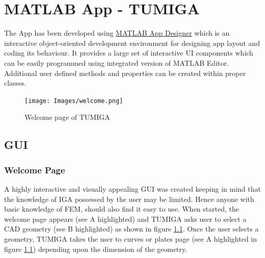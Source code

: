 \documentclass[12pt, a4paper]{report}
\begin{document}
 

\chapter{MATLAB App - TUMIGA}\label{chap: App}


The App has been developed using \href{https://de.mathworks.com/products/matlab/app-designer.html}{MATLAB App Designer} which is an interactive object-oriented development environment for designing app layout and coding its behaviour. It provides a large set of interactive UI components which can be easily programmed using integrated version of MATLAB Editor. Additional user defined methods and properties can be created within proper classes.
\begin{figure}[H]
\centering
\texttt{[image: Images/welcome.png]}
\caption{Welcome page of TUMIGA}
\label{fig:welcome}
\end{figure}
\section{GUI}
\subsection{Welcome Page}
A highly interactive and visually appealing GUI was created keeping in mind that the knowledge of IGA possessed by the user may be limited. Hence anyone with basic knowledge of FEM, should also find it easy to use. When started, the welcome page appears (see A highlighted) and TUMIGA asks user to select a CAD geometry (see B highlighted) as shown in figure \ref{fig:welcome}. Once the user selects a geometry, TUMIGA takes the user to curves or plates page (see A highlighted in figure \ref{fig:welcome})  depending upon the dimension of the geometry. 
\end{document}
